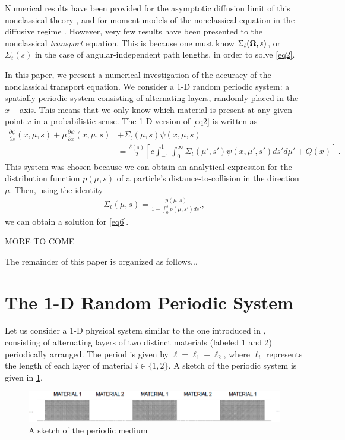 \documentclass[12pt]{article}
\newcommand{\uomega}{{\bf \Omega}}
\begin{document}
Numerical results have been provided for the asymptotic diffusion limit of this nonclassical theory \cite{larvas11,vaslar09,vas13,vaslar14b}, and for moment models of the nonclassical equation in the diffusive regime \cite{kry13}.
However, very few results have been presented to the nonclassical \textit{transport} equation.
This is because one must know $\Sigma_t(\uomega,s)$, or $\Sigma_t(s)$ in the case of angular-independent path lengths, in order to solve \cref{eq2}. 

In this paper, we present a numerical investigation of the accuracy of the nonclassical transport equation.
We consider a 1-D random periodic system: a spatially periodic system consisting of alternating layers, randomly placed in the $x-$axis.
This means that we only know which material is present at any given point $x$ in a probabilistic sense.
The 1-D version of \cref{eq2} is written as
\begin{align}\label{eq6}
\frac{\partial\psi}{\partial s}(x,\mu,s) + \mu\frac{\partial \psi}{\partial x}(x,\mu,s) &+ \Sigma_t(\mu,s)\psi(x,\mu,s) 
\\& = \frac{\delta(s)}{2}\left[ c\int_{-1}^1\int_0^\infty \Sigma_t(\mu',s')\psi(x,\mu',s')ds' d\mu' + Q(x) \right]\,. \nonumber
\end{align}
This system was chosen because we can obtain an analytical expression for the distribution function $p(\mu,s)$ of a particle's distance-to-collision in the direction $\mu$.
Then, using the identity \cite{vaslar14a}
\begin{align}\label{eq7}
\Sigma_t(\mu,s)=\frac{p(\mu,s)}{1-\int_0^sp(\mu,s')ds'},
\end{align}
we can obtain a solution for \cref{eq6}.

MORE TO COME

The remainder of this paper is organized as follows...    

\section{The 1-D Random Periodic System}\label{sec2}

Let us consider a 1-D physical system similar to the one introduced in \cite{zuc94}, consisting of alternating layers of two distinct materials (labeled 1 and 2) periodically arranged.
The period is given by $\ell = \ell_1 + \ell_2$, where $\ell_i$ represents the length of each layer of material $i \in \{1,2\}$.
A sketch of the periodic system is given in \cref{fig1}.
\begin{figure}[htb]
  \centering
  \includegraphics[width=\textwidth]{fig1.eps}
  \caption{A sketch of the periodic medium}
  \label{fig1}
\end{figure}
\end{document}
